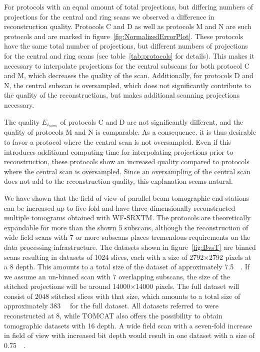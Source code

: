 For protocols with an equal amount of total projections, but differing numbers of projections for the central and ring scans we observed a difference in reconstruction quality. Protocols C and D as well as protocols M and N are such protocols and are marked in figure~\ref{fig:NormalizedErrorPlot}. These protocols have the same total number of projections, but different numbers of projections for the central and ring scans (see table~\ref{tab:protocols} for details). This makes it necessary to interpolate projections for the central subscans for both protocol C and M, which decreases the quality of the scan. Additionally, for protocols D and N, the central subscan is oversampled, which does not significantly contribute to the quality of the reconstructions, but makes additional scanning projections necessary. 

The quality $E_{i_{norm}}$ of protocols C and D are not significantly different, and the quality of protocols M and N is comparable. As a consequence, it is thus desirable to favor a protocol where the central scan is not oversampled. Even if this introduces additional computing time for interpolating projections prior to reconstruction, these protocols show an increased quality compared to protocols where the central scan is oversampled. Since an oversampling of the central scan does not add to the reconstruction quality, this explanation seems natural.

We have shown that the field of view of parallel beam tomographic end-stations can be increased up to five-fold and have three-dimensionally reconstructed multiple tomograms obtained with WF-SRXTM. The protocols are theoretically expandable for more than the shown 5 subscans, although the reconstruction of wide field scans with 7 or more subscans places tremendous requirements on the data processing infrastructure. The datasets shown in figure~\ref{fig:BvsT} are binned scans resulting in datasets of 1024 slices, each with a size of 2792$\times$2792 pixels at a \SI{8}{\bit} depth. This amounts to a total size of the dataset of approximately \SI{7.5}{\giga\byte}. If we assume an un-binned scan with 7 overlapping subscans, the size of the stitched projections will be around 14000$\times$14000 pixels. The full dataset will consist of 2048 stitched slices with that size, which amounts to a total size of approximately \SI{383}{\giga\byte} for the full dataset. All datasets referred to were reconstructed at \SI{8}{\bit}, while TOMCAT also offers the possibility to obtain tomographic datasets with \SI{16}{\bit} depth. A wide field scan with a seven-fold increase in field of view with increased bit depth would result in one dataset with a size of \SI{0.75}{\tera\byte}.

